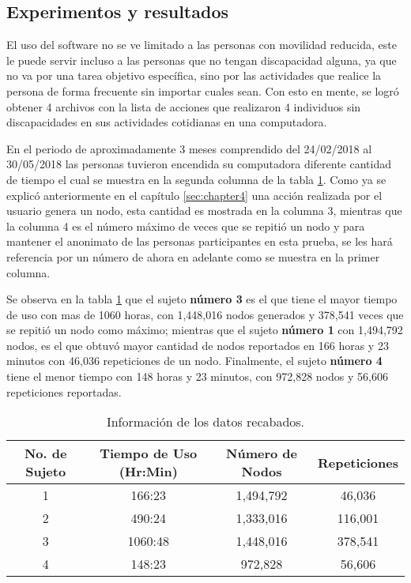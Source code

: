 \subsection{Experimentos y resultados}

El uso del software no se ve limitado a las personas con movilidad reducida,
 este le puede servir incluso a las personas que no tengan discapacidad 
 alguna, ya que no va por una tarea objetivo espec\'ifica, sino por las 
 actividades que realice la persona de forma frecuente sin importar cuales 
 sean. Con esto en mente, se logr\'o obtener 4 archivos con la lista de 
 acciones que realizaron 4 individuos sin discapacidades en sus actividades 
 cotidianas en una computadora.


En el periodo de aproximadamente 3 meses comprendido del 24/02/2018 al 
 30/05/2018 las personas tuvieron encendida su computadora diferente cantidad 
 de tiempo el cual se muestra en la segunda columna de la tabla 
 \ref{infodata}. Como ya se explic\'o anteriormente en el cap\'itulo 
 \ref{sec:chapter4} una acci\'on realizada por el usuario genera un nodo, esta 
 cantidad es mostrada en la columna 3, mientras que la columna 4 es el 
 n\'umero m\'aximo de veces que se repiti\'o un nodo y para mantener el 
 anonimato de las personas participantes en esta prueba, se les har\'a 
 referencia por un n\'umero de ahora en adelante como se muestra en la primer 
 columna. 

Se observa en la tabla \ref{infodata} que el sujeto \textbf{n\'umero 3}
 es el que tiene el mayor tiempo de uso con mas de 1060 horas, con
 1,448,016 nodos generados y 378,541 veces que se repiti\'o un nodo como 
 m\'aximo; mientras que el sujeto \textbf{n\'umero 1} con 1,494,792 nodos, es el 
 que obtuv\'o mayor cantidad de nodos reportados en 166 horas y 23 minutos con 
 46,036 repeticiones de un nodo. Finalmente, el sujeto \textbf{n\'umero 4} tiene 
 el menor tiempo con 148 horas y 23 minutos, con 972,828 nodos y 56,606 
 repeticiones reportadas.


\begin{table}[]
\centering
\begin{tabular}{cccc}
\hline
No. de Sujeto	
&   Tiempo de Uso (Hr:Min)		
&	N\'umero de Nodos	
&   Repeticiones 	\\   
\hline

1				
&	166:23 						
&	1,494,792			
&	46,036				\\
		
2
&	490:24
&	1,333,016
&	116,001				\\
		
3
&	1060:48
&	1,448,016
&	378,541				\\
		
4
&	148:23
&	972,828
&	56,606				\\ 
\hline

\end{tabular}
\caption{Informaci\'on de los datos recabados.}
\label{infodata}
\end{table}

